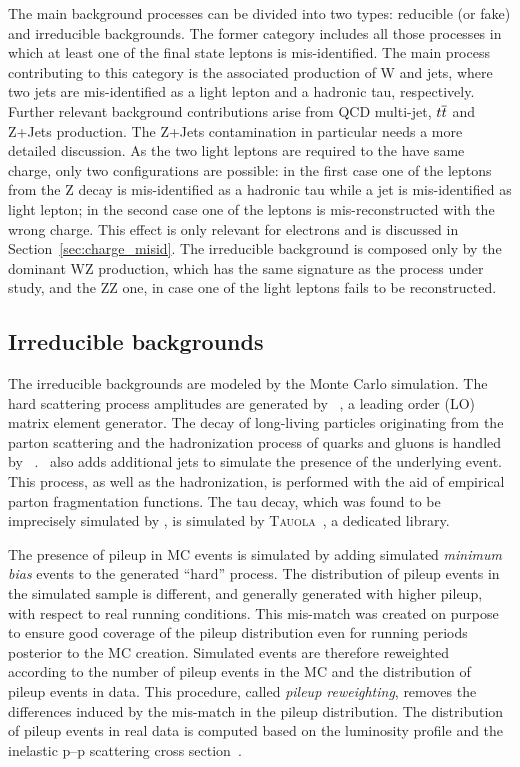 The main background processes can be divided into two types: reducible (or fake) and irreducible backgrounds. The former category includes all those processes in which at least one of the final state leptons is mis-identified. The main process contributing to this category is the associated production of W and jets, where two jets are mis-identified as a light lepton and a hadronic tau, respectively. Further relevant background contributions arise from QCD multi-jet, $t\overline{t}$ and Z+Jets production. The Z+Jets contamination in particular needs a more detailed discussion. As the two light leptons are required to the have same charge, only two configurations are possible: in the first case one of the leptons from the Z decay is mis-identified as a hadronic tau while a jet is mis-identified as light lepton; in the second case one of the leptons is mis-reconstructed with the wrong charge. This effect is only relevant for electrons and is discussed in Section~\ref{sec:charge_misid}. The irreducible background is composed only by the dominant WZ production, which has the same signature as the process under study, and the ZZ one, in case one of the light leptons fails to be reconstructed.

\subsection{Irreducible backgrounds}

The irreducible backgrounds are modeled by the Monte Carlo simulation. The hard scattering process amplitudes are generated by \madgraph~\cite{MG4}, a leading order (LO) matrix element generator. The decay of long-living particles originating from the parton scattering and the hadronization process of quarks and gluons is handled by \pythia\ \cite{pythia}. \pythia\ also adds additional jets to simulate the presence of the underlying event. This process, as well as the hadronization, is performed with the aid of empirical parton fragmentation functions. The tau decay, which was found to be imprecisely simulated by \pythia, is simulated by \textsc{Tauola}~\cite{tauola}, a dedicated library. 

The presence of pileup in MC events is simulated by adding simulated \emph{minimum bias} events to the generated ``hard'' process. The distribution of pileup events in the simulated sample is different, and generally generated with higher pileup, with respect to real running conditions. 
This mis-match was created on purpose to ensure good coverage of the pileup distribution even for running periods posterior to the MC creation.
Simulated events are therefore reweighted according to the number of pileup events in the MC and the distribution of pileup events in data. This procedure, called \emph{pileup reweighting}, removes the differences induced by the mis-match in the pileup distribution. The distribution of pileup events in real data is computed based on the luminosity profile and the inelastic p--p scattering cross section~\cite{Antchev:2013paa}.

